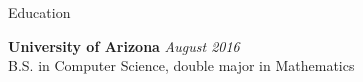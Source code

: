 \documentclass{resume} %
\begin{document}

\begin{rSection}{Education}
	
	{\bf University of Arizona} \hfill {\em August 2016} \\ 
	B.S. in Computer Science, double major in Mathematics  \smallskip \\
	
\end{rSection}


\end{document}
